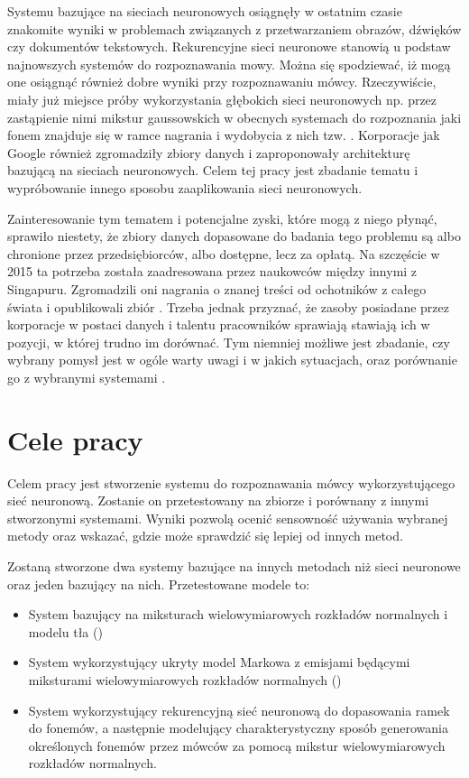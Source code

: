 Systemu bazujące na sieciach neuronowych osiągnęły w ostatnim czasie znakomite wyniki w problemach
związanych z przetwarzaniem obrazów, dźwięków czy dokumentów tekstowych. Rekurencyjne sieci neuronowe
stanowią u podstaw najnowszych systemów do rozpoznawania mowy. Można się spodziewać, iż mogą one
osiągnąć również dobre wyniki przy rozpoznawaniu mówcy. Rzeczywiście, miały już miejsce próby
wykorzystania głębokich sieci neuronowych np. przez zastąpienie nimi
mikstur gaussowskich w obecnych systemach do rozpoznania
jaki fonem znajduje się w ramce nagrania i wydobycia z nich tzw.
\cite{investigationOfBottleneck}.
Korporacje jak Google również zgromadziły zbiory danych i zaproponowały architekturę bazującą na sieciach
neuronowych\cite{endToEnd}. Celem tej pracy jest zbadanie tematu i wypróbowanie innego sposobu zaaplikowania
sieci neuronowych.

Zainteresowanie tym tematem i potencjalne zyski, które mogą z niego płynąć, sprawiło niestety,
że zbiory danych dopasowane do badania tego problemu są albo chronione przez przedsiębiorców,
albo dostępne, lecz za opłatą. Na szczęście w 2015 ta potrzeba
została zaadresowana przez naukowców między innymi z Singapuru. Zgromadzili oni nagrania o znanej
treści od ochotników z całego świata i opublikowali zbiór . Trzeba jednak przyznać, że
zasoby posiadane przez korporacje w postaci danych i talentu pracowników sprawiają stawiają ich
w pozycji, w której trudno im dorównać.  Tym niemniej możliwe jest zbadanie, czy wybrany pomysł
jest w ogóle warty uwagi i w jakich sytuacjach, oraz porównanie go z wybranymi systemami .

\section{Cele pracy}\label{sec:cele_pracy}

Celem pracy jest stworzenie systemu do rozpoznawania mówcy wykorzystującego sieć neuronową.
Zostanie on przetestowany na zbiorze  i porównany z innymi stworzonymi systemami.
Wyniki pozwolą ocenić sensowność używania wybranej metody oraz wskazać, gdzie może sprawdzić się lepiej
od innych metod.

Zostaną stworzone dwa systemy bazujące na innych metodach niż sieci neuronowe oraz jeden bazujący na nich. Przetestowane
modele to:

\begin{itemize}
    \item System bazujący na miksturach wielowymiarowych rozkładów normalnych i modelu tła ()
    \item System wykorzystujący ukryty model Markowa z emisjami będącymi miksturami wielowymiarowych rozkładów normalnych ()
    \item System wykorzystujący rekurencyjną sieć neuronową do dopasowania ramek do fonemów, a następnie modelujący charakterystyczny sposób generowania określonych fonemów przez mówców za pomocą mikstur wielowymiarowych rozkładów normalnych.
\end{itemize}

